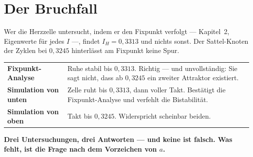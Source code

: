 \section{Der Bruchfall}

\begin{warnung}
Wer die Herzzelle untersucht, indem er den Fixpunkt verfolgt --- Kapitel~2, Eigenwerte für jedes $I$ ---, findet $I_H = 0{,}3313$ und nichts sonst. Der Sattel-Knoten der Zyklen bei $0{,}3245$ hinterlässt am Fixpunkt keine Spur.

\begin{center}
{\small
\renewcommand{\arraystretch}{1.5}
\begin{tabular}{@{}P{2.8cm}P{5.8cm}@{}}
\toprule
\textbf{Fixpunkt-Analyse} & Ruhe stabil bis $0{,}3313$. Richtig --- und unvollständig: Sie sagt nicht, dass ab $0{,}3245$ ein zweiter Attraktor existiert.\\
\textbf{Simulation von unten} & Zelle ruht bis $0{,}3313$, dann voller Takt. Bestätigt die Fixpunkt-Analyse und verfehlt die Bistabilität.\\
\textbf{Simulation von oben} & Takt bis $0{,}3245$. Widerspricht scheinbar beiden.\\
\bottomrule
\end{tabular}}
\end{center}

\begin{center}
\begin{minipage}{0.9\textwidth}
\textbf{Drei Untersuchungen, drei Antworten --- und keine ist falsch. Was fehlt, ist die Frage nach dem Vorzeichen von $a$.}
\end{minipage}
\end{center}

\begin{center}
\begin{minipage}{0.88\textwidth}
\end{minipage}
\end{center}
\end{warnung}

